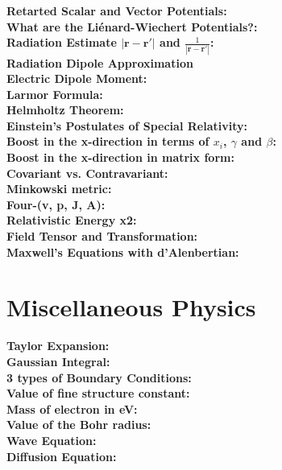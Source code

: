 \documentclass[12pt]{extarticle}
\renewcommand{\r}{\mathbf{r}}
\newcommand{\wavr}{\left|\r-\r'\right|}
\begin{document}
\textbf{Retarted Scalar and Vector Potentials:} \\
\textbf{What are the Li\'enard-Wiechert Potentials?:} \\
\textbf{Radiation Estimate $\wavr$ and $\frac{1}{\wavr}$:} \\
\textbf{Radiation Dipole Approximation} \\
\textbf{Electric Dipole Moment:} \\
\textbf{Larmor Formula:} \\
\textbf{Helmholtz Theorem:} \\
\textbf{Einstein's Postulates of Special Relativity:} \\
\textbf{Boost in the x-direction in terms of $x_i$, $\gamma$ and $\beta$:} \\
\textbf{Boost in the x-direction in matrix form:} \\
\textbf{Covariant vs. Contravariant:} \\
\textbf{Minkowski metric:} \\
\textbf{Four-(v, p, J, A):} \\
\textbf{Relativistic Energy x2:} \\
\textbf{Field Tensor and Transformation:} \\
\textbf{Maxwell's Equations with d'Alenbertian:} \\

\section{Miscellaneous Physics}
\textbf{Taylor Expansion:} \\
\textbf{Gaussian Integral:} \\
\textbf{3 types of Boundary Conditions:} \\
\textbf{Value of fine structure constant:} \\
\textbf{Mass of electron in eV:} \\
\textbf{Value of the Bohr radius:} \\
\textbf{Wave Equation:} \\
\textbf{Diffusion Equation:} \\
\end{document}
